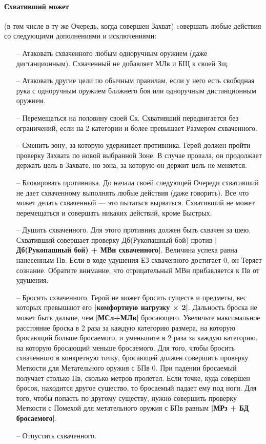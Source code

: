 \paragraph{Схвативший может} (в том числе в ту же Очередь, когда совершен Захват) cовершать любые действия со следующими дополнениями и исключениями:
\begin{itemize}
\item[--] Атаковать схваченного любым одноручным оружием (даже дистанционным). Схваченный не добавляет МЛв и БЩ к своей Зщ.
\item[--] Атаковать другие цели по обычным правилам, если у него есть свободная рука с одноручным оружием ближнего боя или одноручным дистанционным оружием.
\item[--] Перемещаться на половину своей Ск. Схвативший передвигается без ограничений, если на 2 категории и более превышает Размером схваченного.
\item[--] Сменить зону, за которую удерживает противника. Герой должен пройти проверку Захвата по новой выбранной Зоне. В случае провала, он продолжает держать цель в Захвате, но зона, за которую он держит цель не меняется.
\item[--] Блокировать противника. До начала своей следующей Очереди схвативший не дает схваченному выполнять любые действия (даже говорить). Все что может делать схваченный — это пытаться вырваться. Схвативший не может перемещаться и совершать никаких действий, кроме Быстрых.
\item[--] Душить схваченного. Для этого противник должен быть схвачен за шею. Схвативший совершает проверку Дб(Рукопашный бой) против \textbf{|Дб(Рукопашный бой) + МВн схваченного|}. Величина успеха равна нанесенным Пв. Если в ходе удушения ЕЗ схваченного достигает 0, он Теряет сознание. Обратите внимание, что отрицательный МВн прибавляется к Пв от удушения.
\item[--] Бросить схваченного. Герой не может бросать существ и предметы, вес которых превышают его \textbf{|комфортную нагрузку × 2|}. Дальность броска не может быть дальше, чем \textbf{|МСл+МЛв|} бросающего. Увеличьте максимальное расстояние броска в 2 раза за каждую категорию размера, на которую бросающий больше бросаемого, и уменьшите в 2 раза за каждую категорию, на которую бросающий меньше бросаемого.
\newline Для того, чтобы бросить схваченного в конкретную точку, бросающей должен совершить проверку Меткости для Метательного оружия с БПв 0. При падении бросаемый получает столько Пв, сколько метров пролетел. Если точке, куда совершен бросок, находится другое существо, то бросаемый падает ему под ноги.
\newline Для того, чтобы попасть по другому существу, нужно совершить проверку Меткости с Помехой для метательного оружия с БПв равным \textbf{|МРз + БД бросаемого|}.
\item[--] Отпустить схваченного.
\end{itemize}
